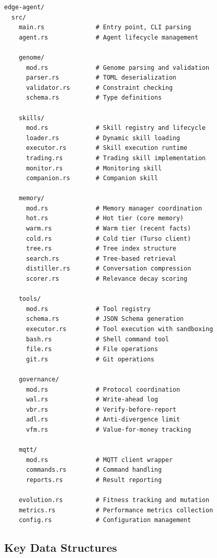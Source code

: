 \documentclass[conference]{IEEEtran}
\begin{document}
\begin{lstlisting}[basicstyle=\ttfamily\footnotesize]
edge-agent/
  src/
    main.rs              # Entry point, CLI parsing
    agent.rs             # Agent lifecycle management
    
    genome/
      mod.rs             # Genome parsing and validation
      parser.rs          # TOML deserialization
      validator.rs       # Constraint checking
      schema.rs          # Type definitions
      
    skills/
      mod.rs             # Skill registry and lifecycle
      loader.rs          # Dynamic skill loading
      executor.rs        # Skill execution runtime
      trading.rs         # Trading skill implementation
      monitor.rs         # Monitoring skill
      companion.rs       # Companion skill
      
    memory/
      mod.rs             # Memory manager coordination
      hot.rs             # Hot tier (core memory)
      warm.rs            # Warm tier (recent facts)
      cold.rs            # Cold tier (Turso client)
      tree.rs            # Tree index structure
      search.rs          # Tree-based retrieval
      distiller.rs       # Conversation compression
      scorer.rs          # Relevance decay scoring
      
    tools/
      mod.rs             # Tool registry
      schema.rs          # JSON Schema generation
      executor.rs        # Tool execution with sandboxing
      bash.rs            # Shell command tool
      file.rs            # File operations
      git.rs             # Git operations
      
    governance/
      mod.rs             # Protocol coordination
      wal.rs             # Write-ahead log
      vbr.rs             # Verify-before-report
      adl.rs             # Anti-divergence limit
      vfm.rs             # Value-for-money tracking
      
    mqtt/
      mod.rs             # MQTT client wrapper
      commands.rs        # Command handling
      reports.rs         # Result reporting
      
    evolution.rs         # Fitness tracking and mutation
    metrics.rs           # Performance metrics collection
    config.rs            # Configuration management
\end{lstlisting}

\subsection{Key Data Structures}
\end{document}
